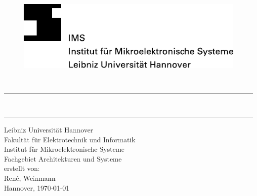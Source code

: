 \begin{titlepage}
	\begin{figure}[ht]
			\includegraphics{pics/IMS_LUH.pdf}
	\end{figure}
	
\vspace{2.5cm}

\begin{center}
	\Huge\normalfont{}\\
	\vspace{40pt}
	\par\noindent\rule{\textwidth}{0.4pt}
  \LARGE\normalfont{}\\
  \par\noindent\rule{\textwidth}{0.4pt}
	\vspace{60pt}
  \Large{	Leibniz Universität Hannover\\
					Fakultät für Elektrotechnik und Informatik\\
					Institut für Mikroelektronische Systeme\\
					Fachgebiet Architekturen und Systeme}\\
	\vspace{70pt}
  \large{erstellt von:}\\
  \vspace{10pt}
	\Large{Ren\'{e}, Weinmann}\\
	\vspace{40pt}
	\Large{Hannover, \today}
	  
  \end{center}

\end{titlepage}

